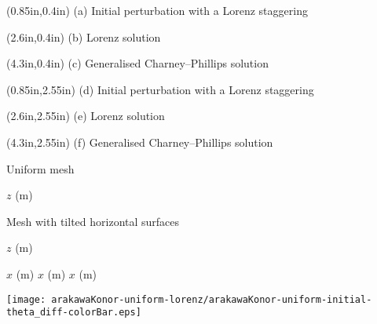 \documentclass{article}
\begin{document}
\TPMargin{2pt}

\begin{textblock*}{10.4em}(0.85in,0.4in)
\small
{}
(a) Initial perturbation with a Lorenz staggering
\end{textblock*}

\begin{textblock*}{8em}(2.6in,0.4in)
\small
{}
(b) Lorenz solution
\end{textblock*}

\begin{textblock*}{10.4em}(4.3in,0.4in)
\small
{}
(c) Generalised Charney--Phillips solution
\end{textblock*}

\begin{textblock*}{10.4em}(0.85in,2.55in)
\small
{}
(d) Initial perturbation with a Lorenz staggering
\end{textblock*}

\begin{textblock*}{8em}(2.6in,2.55in)
\small
{}
(e) Lorenz solution
\end{textblock*}

\begin{textblock*}{10.4em}(4.3in,2.55in)
\small
{}
(f) Generalised Charney--Phillips solution
\end{textblock*}

\begin{center}
\normalsize
Uniform mesh
\end{center}

$z$ (\si{\meter}) 

\vspace*{0.5em}
\begin{center}
Mesh with tilted horizontal surfaces
\end{center}

$z$ (\si{\meter}) 

\vspace{0.5em}
\hspace*{11em}$x$ (\si{\meter}) \hspace*{10em}$x$ (\si{\meter}) \hspace*{10em}$x$ (\si{\meter})

\centering
\texttt{[image: arakawaKonor-uniform-lorenz/arakawaKonor-uniform-initial-theta\_diff-colorBar.eps]}
\end{document}
